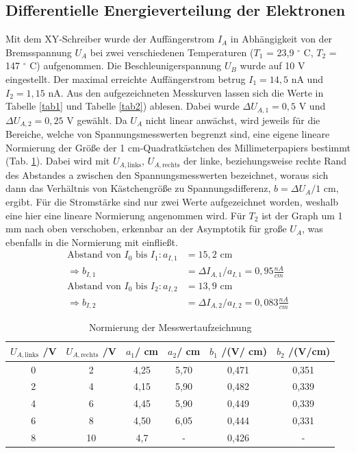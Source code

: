 \subsection{Differentielle Energieverteilung der Elektronen} \label{kap1}
 
Mit dem XY-Schreiber wurde der Auffängerstrom $I_A$ in Abhängigkeit von
der Bremsspannung $U_A$ bei zwei verschiedenen Temperaturen ($T_1$ = 23,9 $^{\circ}$ C, 
$T_2$ = 147 $^{\circ}$ C) aufgenommen. Die Beschleunigerspannung $ U_B $ wurde auf 10 V eingestellt. 
Der maximal erreichte Auffängerstrom betrug $I_1=14,5$ nA und $I_2=1,15$ nA.
Aus den aufgezeichneten Messkurven lassen sich die Werte in Tabelle \ref{tab1} und Tabelle \ref{tab2}) 
ablesen. Dabei wurde $\Delta U_{A,1}=0,5$ V und $\Delta U_{A,2}=0,25$ V gewählt. Da $U_A$ nicht
linear anwächst, wird jeweils für die Bereiche, welche von Spannungsmesswerten begrenzt sind,
eine eigene lineare Normierung der Größe der 1 cm-Quadratkästchen des Millimeterpapiers bestimmt (Tab. \ref{tabnorm}).
Dabei wird mit $U_{A,\text{links}}$, $U_{A,\text{rechts}}$ der linke, beziehungsweise rechte Rand 
des Abstandes a zwischen den Spannungsmesswerten bezeichnet, woraus sich dann das Verhältnis von
Kästchengröße zu Spannungsdifferenz, $b=\Delta U_A / 1$ cm, ergibt. Für die Stromstärke sind nur 
zwei Werte aufgezeichnet worden, weshalb eine hier eine lineare Normierung angenommen wird. Für 
$T_2$ ist der Graph um 1 mm nach oben verschoben, erkennbar an der Asymptotik für große $U_A$, was
ebenfalls in die Normierung mit einfließt.
\begin{align}
\text{Abstand von }I_0 \text{ bis }I_1: a_{I,1}&=15,2\text{ cm} \\
\Rightarrow b_{I,1}&=\Delta I_ {A,1}/a_{I,1}=0,95\frac{nA}{ cm} \\
\text{Abstand von }I_0 \text{ bis }I_2: a_{I,2}&=13,9\text{ cm} \\
\Rightarrow b_{I,2}&=\Delta I_ {A,2}/a_{I,2}=0,083\frac{nA}{ cm}
\end{align}

\begin{table}[h]
\begin{center}
\begin{tabular}[c]{cc|cc|cc} 
$U_{A,\text{links}}$ /V & $U_{A,\text{rechts}}$ /V &$a_1$/ cm&$a_2$/ cm& $b_1$ /(V/ cm)& $b_2$ /(V/cm)\\ \hline
0&2&4,25&5,70&0,471&0,351\\
2&4&4,15&5,90&0,482&0,339\\
4&6&4,45&5,90&0,449&0,339\\
6&8&4,50&6,05&0,444&0,331\\
8&10&4,7& - &0,426& - 
\end{tabular}
\caption{Normierung der Messwertaufzeichnung}
\label{tabnorm}
\end{center}
\end{table}

